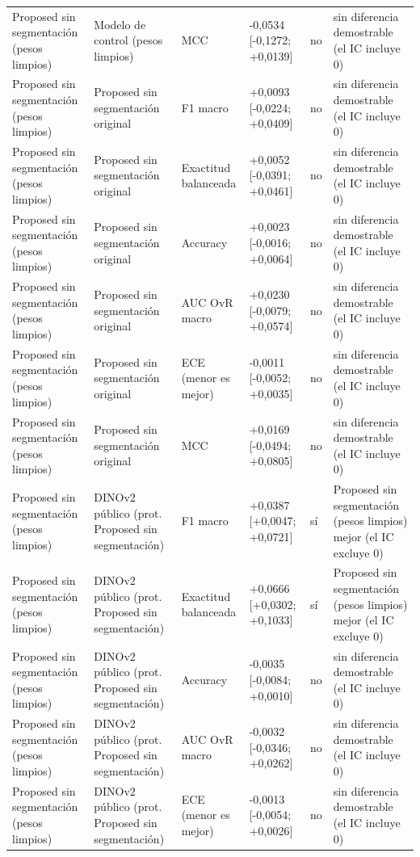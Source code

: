 \begin{longtable}{@{}llllll@{}}
Proposed sin segmentación (pesos limpios) & Modelo de control (pesos limpios) & MCC & -0,0534 [-0,1272; +0,0139] & no & sin diferencia demostrable (el IC incluye 0) \\
Proposed sin segmentación (pesos limpios) & Proposed sin segmentación original & F1 macro & +0,0093 [-0,0224; +0,0409] & no & sin diferencia demostrable (el IC incluye 0) \\
Proposed sin segmentación (pesos limpios) & Proposed sin segmentación original & Exactitud balanceada & +0,0052 [-0,0391; +0,0461] & no & sin diferencia demostrable (el IC incluye 0) \\
Proposed sin segmentación (pesos limpios) & Proposed sin segmentación original & Accuracy & +0,0023 [-0,0016; +0,0064] & no & sin diferencia demostrable (el IC incluye 0) \\
Proposed sin segmentación (pesos limpios) & Proposed sin segmentación original & AUC OvR macro & +0,0230 [-0,0079; +0,0574] & no & sin diferencia demostrable (el IC incluye 0) \\
Proposed sin segmentación (pesos limpios) & Proposed sin segmentación original & ECE (menor es mejor) & -0,0011 [-0,0052; +0,0035] & no & sin diferencia demostrable (el IC incluye 0) \\
Proposed sin segmentación (pesos limpios) & Proposed sin segmentación original & MCC & +0,0169 [-0,0494; +0,0805] & no & sin diferencia demostrable (el IC incluye 0) \\
Proposed sin segmentación (pesos limpios) & DINOv2 público (prot. Proposed sin segmentación) & F1 macro & +0,0387 [+0,0047; +0,0721] & sí & Proposed sin segmentación (pesos limpios) mejor (el IC excluye 0) \\
Proposed sin segmentación (pesos limpios) & DINOv2 público (prot. Proposed sin segmentación) & Exactitud balanceada & +0,0666 [+0,0302; +0,1033] & sí & Proposed sin segmentación (pesos limpios) mejor (el IC excluye 0) \\
Proposed sin segmentación (pesos limpios) & DINOv2 público (prot. Proposed sin segmentación) & Accuracy & -0,0035 [-0,0084; +0,0010] & no & sin diferencia demostrable (el IC incluye 0) \\
Proposed sin segmentación (pesos limpios) & DINOv2 público (prot. Proposed sin segmentación) & AUC OvR macro & -0,0032 [-0,0346; +0,0262] & no & sin diferencia demostrable (el IC incluye 0) \\
Proposed sin segmentación (pesos limpios) & DINOv2 público (prot. Proposed sin segmentación) & ECE (menor es mejor) & -0,0013 [-0,0054; +0,0026] & no & sin diferencia demostrable (el IC incluye 0) \\

\end{longtable}
